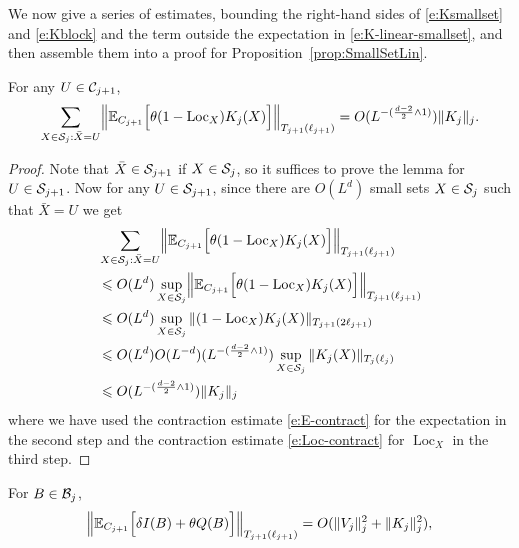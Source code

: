 \documentclass[11pt]{amsart}
\numberwithin{equation}{section}
\numberwithin{theorem}{section}
\newcommand{\1}{{\bf 1}}
\newcommand{\dplus}{(\frac{d-2}{2} \wedge 1)}
\newcommand{\Loc}{\operatorname{Loc}}
\begin{document}
We now give a series of estimates, bounding the right-hand sides of \eqref{e:Ksmallset} and \eqref{e:Kblock}
and the term outside the expectation in \eqref{e:K-linear-smallset},
and then assemble them into a proof for Proposition~\ref{prop:SmallSetLin}.

\begin{lemma} \label{lem:smallset-K}
  For any $U \in \mathcal C_{j+1}$,
  \begin{equation}
    \sum_{X \in \cS_j: \bar X=U} \normB{
      \E_{C_{j+1}}\qB{\theta(1-\Loc_X) K_j(X)}
    }_{T_{j+1}(\ell_{j+1})} = 
    O(L^{-\dplus}) \|K_j\|_j.
  \end{equation}
\end{lemma}
\begin{proof}
  Note that $\bar X \in \mathcal S_{j+1}$ if $X \in \mathcal S_j$, so it suffices to
  prove the lemma for $U\in \mathcal S_{j+1}$.  Now for any
  $U \in \mathcal S_{j+1}$, since there are $O(L^d)$
  small sets $X\in \mathcal S_j$ such that $\bar X=U$ we get 
  \begin{align} \label{e:Kpf-contract}
    &\sum_{X \in \cS_j: \bar X=U} \normB{\E_{C_{j+1}}\qB{\theta(1-\Loc_X)  K_j(X)}}_{T_{j+1}(\ell_{j+1})}
      \nnb
  &\leq O(L^d)   \sup_{X \in \cS_j} \normB{\E_{C_{j+1}}\qB{\theta(1-\Loc_X) K_j(X)}}_{T_{j+1}(\ell_{j+1})}
    \nnb
  &\leq O(L^d)   \sup_{X \in \cS_j} \|(1-\Loc_X) K_j(X)\|_{T_{j+1}(2\ell_{j+1})}
    \nnb
  &\leq O(L^d)  O(L^{-d}) (L^{-\dplus}
    ) \sup_{X \in \cS_j} \|K_j(X)\|_{T_{j}(\ell_{j})}
    \nnb
    &\leq
    O( L^{-\dplus}) \|K_j\|_j
\end{align}
where we have used the contraction estimate \eqref{e:E-contract} for the expectation
in the second step and
the contraction estimate \eqref{e:Loc-contract} for $\Loc_X$ in the third step.
\end{proof}


\begin{lemma} \label{lem:smallset-V}
  For  $B \in \mathcal B_j$, 
  \begin{equation} 
  \label{e:smallset-V-2}
  \Bigl\lVert \mathbb{E}_{C_{j+1}}\Bigl[{\delta I(B) + \theta Q(B)}\Bigr]
   \Bigr\rVert_{T_{j+1}(\ell_{j+1})} = O(\|V_j\|_j^2 + \|K_j\|_j^2),
  \end{equation}
\end{lemma}
\end{document}

